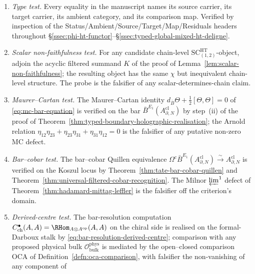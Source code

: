 \begin{enumerate}[label=\textup{(V\arabic*)}]
  \item \emph{Type test.}  Every equality in the manuscript names its
        source carrier, its target carrier, its ambient category, and
        its comparison map.  Verified by inspection of the
        Status/Ambient/Source/Target/Map/Residuals headers throughout
        \S\ref{ssec:phi-ht-functor}--\S\ref{ssec:typed-global-mixed-ht-deligne}.
  \item \emph{Scalar non-faithfulness test.}  For any candidate
        chain-level
        \(\mathrm{SC}^{\mathrm{HT}}_{(1,2)}\)-object, adjoin the
        acyclic filtered summand \(K\) of the proof of
        Lemma~\ref{lem:scalar-non-faithfulness}; the resulting object
        has the same \(\chi\) but inequivalent chain-level structure.
        The probe is the falsifier of any scalar-determines-chain
        claim.
  \item \emph{Maurer--Cartan test.}  The Maurer--Cartan identity
        \(d_{\bar B}\Theta+\tfrac12[\Theta,\Theta]=0\) of
        \eqref{eq:mc-bar-equation} is verified on the bar
        \(\bar B^{E_1}(A^{\mathrm{cl}}_{\partial,N})\) by step~(ii) of
        the proof of
        Theorem~\ref{thm:typed-boundary-holographic-realisation}; the
        Arnold relation
        \(\eta_{12}\eta_{23}+\eta_{23}\eta_{31}+\eta_{31}\eta_{12}=0\)
        is the falsifier of any putative non-zero MC defect.
  \item \emph{Bar--cobar test.}  The bar--cobar Quillen equivalence
        \(\Omega^{\mathrm{c}}\bar B^{E_1}(A^{\mathrm{cl}}_{\partial,N})
        \xrightarrow{\sim}A^{\mathrm{cl}}_{\partial,N}\) is verified
        on the Koszul locus by
        Theorem~\ref{thm:tate-bar-cobar-quillen} and
        Theorem~\ref{thm:universal-filtered-cobar-recognition}.  The
        Milnor \(\varprojlim^1\) defect of
        Theorem~\ref{thm:hadamard-mittag-leffler} is the falsifier
        off the criterion's domain.
  \item \emph{Derived-centre test.}  The bar-resolution computation
        \(C^\bullet_{\mathrm{ch}}(A,A)=\RHom_{A\otimes A^{\mathrm{op}}}(A,A)\)
        on the chiral side is realised on the formal-Darboux stalk by
        \eqref{eq:bar-resolution-derived-centre}; comparison with any
        proposed physical bulk \(\mathcal O^{\mathrm{phys}}_{\mathrm{bulk}}\)
        is mediated by the open--closed comparison
        \(\mathrm{OCA}\) of Definition~\ref{defn:oca-comparison}, with
        falsifier the non-vanishing of any component of

\end{enumerate}

